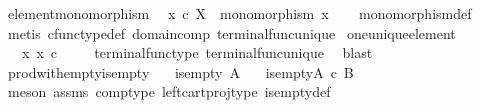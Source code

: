 \begin{isabellebody}
\isamarkupfalse%
\ element{\isacharunderscore}{\kern0pt}monomorphism{\isacharcolon}{\kern0pt}\isanewline
\ \ {\isachardoublequoteopen}x\ {\isasymin}\isactrlsub c\ X\ {\isasymLongrightarrow}\ monomorphism\ x{\isachardoublequoteclose}\isanewline
%
\isadelimproof
\ \ %
\endisadelimproof
%
\isatagproof
{}\isamarkupfalse%
\ monomorphism{\isacharunderscore}{\kern0pt}def\isanewline
\ \ \isamarkupfalse%
\ {\isacharparenleft}{\kern0pt}metis\ cfunc{\isacharunderscore}{\kern0pt}type{\isacharunderscore}{\kern0pt}def\ domain{\isacharunderscore}{\kern0pt}comp\ terminal{\isacharunderscore}{\kern0pt}func{\isacharunderscore}{\kern0pt}unique{\isacharparenright}{\kern0pt}%
\endisatagproof
{\isafoldproof}%
%
\isadelimproof
\isanewline
%
\endisadelimproof
\isanewline
{}\isamarkupfalse%
\ one{\isacharunderscore}{\kern0pt}unique{\isacharunderscore}{\kern0pt}element{\isacharcolon}{\kern0pt}\isanewline
\ \ {\isachardoublequoteopen}{\isasymexists}{\isacharbang}{\kern0pt}\ x{\isachardot}{\kern0pt}\ x\ {\isasymin}\isactrlsub c\ {\isasymone}{\isachardoublequoteclose}\isanewline
%
\isadelimproof
\ \ %
\endisadelimproof
%
\isatagproof
{}\isamarkupfalse%
\ terminal{\isacharunderscore}{\kern0pt}func{\isacharunderscore}{\kern0pt}type\ terminal{\isacharunderscore}{\kern0pt}func{\isacharunderscore}{\kern0pt}unique\ \isamarkupfalse%
\ blast%
\endisatagproof
{\isafoldproof}%
%
\isadelimproof
\isanewline
%
\endisadelimproof
\isanewline
{}\isamarkupfalse%
\ prod{\isacharunderscore}{\kern0pt}with{\isacharunderscore}{\kern0pt}empty{\isacharunderscore}{\kern0pt}is{\isacharunderscore}{\kern0pt}empty{}{\isacharcolon}{\kern0pt}\isanewline
\ \ \ {\isachardoublequoteopen}is{\isacharunderscore}{\kern0pt}empty\ {\isacharparenleft}{\kern0pt}A{\isacharparenright}{\kern0pt}{\isachardoublequoteclose}\isanewline
\ \ \ {\isachardoublequoteopen}is{\isacharunderscore}{\kern0pt}empty{\isacharparenleft}{\kern0pt}A\ {\isasymtimes}\isactrlsub c\ B{\isacharparenright}{\kern0pt}{\isachardoublequoteclose}\isanewline
%
\isadelimproof
\ \ %
\endisadelimproof
%
\isatagproof
{}\isamarkupfalse%
\ {\isacharparenleft}{\kern0pt}meson\ assms\ comp{\isacharunderscore}{\kern0pt}type\ left{\isacharunderscore}{\kern0pt}cart{\isacharunderscore}{\kern0pt}proj{\isacharunderscore}{\kern0pt}type\ is{\isacharunderscore}{\kern0pt}empty{\isacharunderscore}{\kern0pt}def{\isacharparenright}{\kern0pt}%
\endisatagproof
{\isafoldproof}%
%
\isadelimproof
\isanewline
%

\end{isabellebody}
